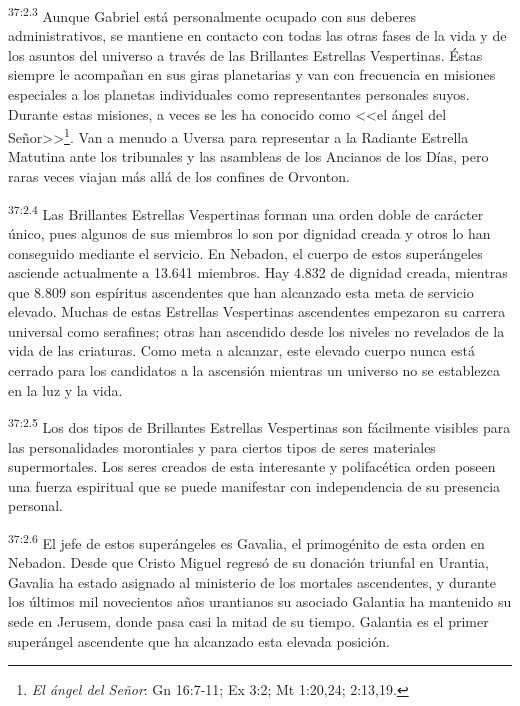 \par
\textsuperscript{37:2.3} Aunque Gabriel está personalmente ocupado con sus deberes administrativos, se mantiene en contacto con todas las otras fases de la vida y de los asuntos del universo a través de las Brillantes Estrellas Vespertinas. Éstas siempre le acompañan en sus giras planetarias y van con frecuencia en misiones especiales a los planetas individuales como representantes personales suyos. Durante estas misiones, a veces se les ha conocido como <<el ángel del Señor>>\footnote{\textit{El ángel del Señor}: Gn 16:7-11; Ex 3:2; Mt 1:20,24; 2:13,19.}. Van a menudo a Uversa para representar a la Radiante Estrella Matutina ante los tribunales y las asambleas de los Ancianos de los Días, pero raras veces viajan más allá de los confines de Orvonton.

\par
\textsuperscript{37:2.4} Las Brillantes Estrellas Vespertinas forman una orden doble de carácter único, pues algunos de sus miembros lo son por dignidad creada y otros lo han conseguido mediante el servicio. En Nebadon, el cuerpo de estos superángeles asciende actualmente a 13.641 miembros. Hay 4.832 de dignidad creada, mientras que 8.809 son espíritus ascendentes que han alcanzado esta meta de servicio elevado. Muchas de estas Estrellas Vespertinas ascendentes empezaron su carrera universal como serafines; otras han ascendido desde los niveles no revelados de la vida de las criaturas. Como meta a alcanzar, este elevado cuerpo nunca está cerrado para los candidatos a la ascensión mientras un universo no se establezca en la luz y la vida.

\par
\textsuperscript{37:2.5} Los dos tipos de Brillantes Estrellas Vespertinas son fácilmente visibles para las personalidades morontiales y para ciertos tipos de seres materiales supermortales. Los seres creados de esta interesante y polifacética orden poseen una fuerza espiritual que se puede manifestar con independencia de su presencia personal.

\par
\textsuperscript{37:2.6} El jefe de estos superángeles es Gavalia, el primogénito de esta orden en Nebadon. Desde que Cristo Miguel regresó de su donación triunfal en Urantia, Gavalia ha estado asignado al ministerio de los mortales ascendentes, y durante los últimos mil novecientos años urantianos su asociado Galantia ha mantenido su sede en Jerusem, donde pasa casi la mitad de su tiempo. Galantia es el primer superángel ascendente que ha alcanzado esta elevada posición.

